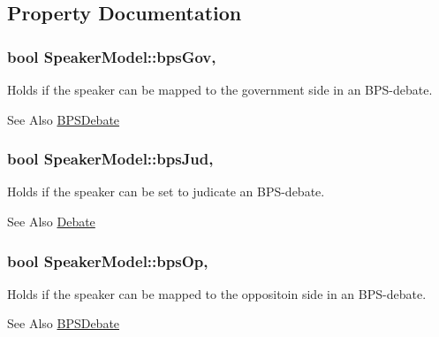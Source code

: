 \subsection{Property Documentation}
\hypertarget{classSpeakerModel_aaf2dd2737f827659f7ca2a8a6b8a87f3}{
\subsubsection[{bps\-Gov}]{\setlength{\rightskip}{0pt plus 5cm}bool Speaker\-Model\-::bps\-Gov\hspace{0.3cm}{\ttfamily [read]}, {\ttfamily [write]}}}\label{classSpeakerModel_aaf2dd2737f827659f7ca2a8a6b8a87f3}
Holds if the speaker can be mapped to the government side in an B\-P\-S-\/debate. \begin{DoxySeeAlso}{See Also}
\hyperlink{classBPSDebate}{B\-P\-S\-Debate} 
\end{DoxySeeAlso}
\hypertarget{classSpeakerModel_a60f2670dcde9e6dbe24661599e6b674c}{
\subsubsection[{bps\-Jud}]{\setlength{\rightskip}{0pt plus 5cm}bool Speaker\-Model\-::bps\-Jud\hspace{0.3cm}{\ttfamily [read]}, {\ttfamily [write]}}}\label{classSpeakerModel_a60f2670dcde9e6dbe24661599e6b674c}
Holds if the speaker can be set to judicate an B\-P\-S-\/debate. \begin{DoxySeeAlso}{See Also}
\hyperlink{classDebate}{Debate} 
\end{DoxySeeAlso}
\hypertarget{classSpeakerModel_a2f2cac7000658283ccf8d06683b64376}{
\subsubsection[{bps\-Op}]{\setlength{\rightskip}{0pt plus 5cm}bool Speaker\-Model\-::bps\-Op\hspace{0.3cm}{\ttfamily [read]}, {\ttfamily [write]}}}\label{classSpeakerModel_a2f2cac7000658283ccf8d06683b64376}
Holds if the speaker can be mapped to the oppositoin side in an B\-P\-S-\/debate. \begin{DoxySeeAlso}{See Also}
\hyperlink{classBPSDebate}{B\-P\-S\-Debate} 
\end{DoxySeeAlso}
